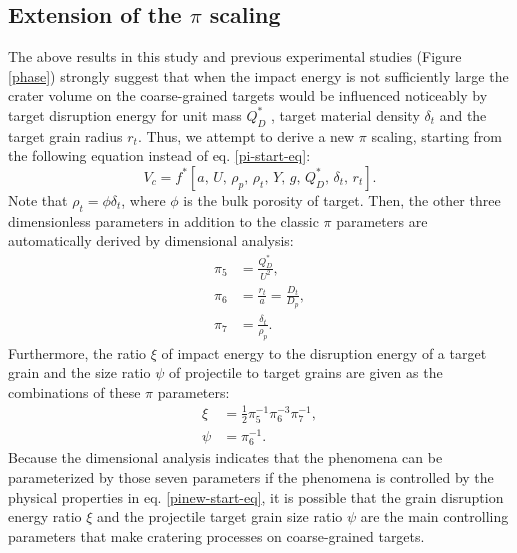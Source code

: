 \documentclass[3p,authoryear]{elsarticle}
\begin{document}
\subsection{Extension of the $\pi$ scaling} \label{sec:extension-pi}
The above results in this study and previous experimental studies (Figure \ref{phase}) strongly suggest that when the impact energy is not sufficiently large the crater volume on the coarse-grained targets would be influenced noticeably by target disruption energy for unit mass $Q_D^*$ \citep[e.g.][]{fujiwara1980b, benz1999}, target material density $\delta_t$ and the target grain radius $r_t$.
Thus, we attempt to derive a new $\pi$ scaling, starting from the following equation instead of eq. \eqref{pi-start-eq}:
\begin{equation}
	V_c=f^*[a,\,U,\,\rho_p,\, \rho_t,\,Y,\, g,\, Q_D^*, \,\delta_t,\, r_t]. \label{pinew-start-eq}
\end{equation}
Note that $\rho_t=\phi \delta_t$, where $\phi$ is the bulk porosity of target.
Then, the other three dimensionless parameters in addition to the classic $\pi$ parameters are automatically derived by dimensional analysis:
\begin{align}
	\pi_5&=\frac{Q_D^*}{U^2},\\
	\pi_6&=\frac{r_t}{a}=\frac{D_t}{D_p},\\
	\pi_7&=\frac{\delta_t}{\rho_p}.
\end{align}
Furthermore, the ratio $\xi$ of impact energy to the disruption energy of a target grain and the size ratio $\psi$ of projectile to target grains are given as the combinations of these $\pi$ parameters:
\begin{align}
	\xi&=\frac{1}{2}\pi_5^{-1}\pi_6^{-3}\pi_7^{-1},\\
	\psi&=\pi_6^{-1}.
\end{align}
Because the dimensional analysis indicates that the phenomena can be parameterized by those seven parameters if the phenomena is controlled by the physical properties in eq. \eqref{pinew-start-eq}, it is possible that the grain disruption energy ratio $\xi$ and the projectile target grain size ratio $\psi$ are the main controlling parameters that make cratering processes on coarse-grained targets.
\end{document}
